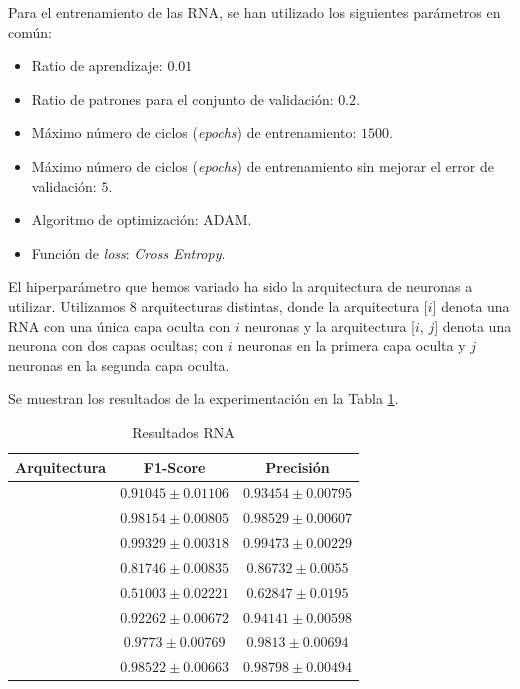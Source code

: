 \documentclass[12pt]{article}
\begin{document}
Para el entrenamiento de las RNA, se han utilizado los siguientes parámetros en común:
\begin{itemize}
	\item Ratio de aprendizaje: $0.01$
	\item Ratio de patrones para el conjunto de validación: $0.2$.
	\item Máximo número de ciclos (\textit{epochs}) de entrenamiento: $1500$.
	\item Máximo número de ciclos (\textit{epochs}) de entrenamiento sin mejorar el error de validación: $5$.
	\item Algoritmo de optimización: ADAM.
	\item Función de \textit{loss}: \textit{Cross Entropy}.
\end{itemize}
El hiperparámetro que hemos variado ha sido la arquitectura de neuronas a utilizar. Utilizamos 8 arquitecturas distintas,
donde la arquitectura [$i$] denota una RNA con una única capa oculta con $i$ neuronas y la arquitectura [$i$, $j$] 
denota una neurona con dos capas ocultas; con $i$ neuronas en la primera capa oculta y $j$ neuronas en la segunda capa oculta.

Se muestran los resultados de la experimentación en la Tabla \ref{Tab:ANN_3}.

\begin{table}[!ht]
	\caption{Resultados RNA}
	\centering
		 \begin{tabular}{||c c c||}
			 \hline
			 Arquitectura & F1-Score & Precisión  \\ [0.5ex]
			 \hline\hline
			 [8] & $0.91045 \pm 0.01106$ & $0.93454 \pm 0.00795$ \\
			\hline
			[16] & $0.98154 \pm 0.00805$ & $0.98529 \pm 0.00607$ \\
			\hline
			[32] & $0.99329 \pm 0.00318$ & $0.99473 \pm 0.00229$ \\
			\hline
			[8, 8] & $0.81746 \pm 0.00835$ & $0.86732 \pm 0.0055$ \\
			\hline
			[16, 4] & $0.51003 \pm 0.02221$ & $0.62847 \pm 0.0195$ \\
			\hline
			[16, 8] & $0.92262 \pm 0.00672$ & $0.94141 \pm 0.00598$ \\
			\hline
			[32, 16] & $0.9773 \pm 0.00769$ & $0.9813 \pm 0.00694$ \\
			\hline
			[32, 32] & $0.98522 \pm 0.00663$ & $0.98798 \pm 0.00494$ \\
			\hline
		 \end{tabular}
	\label{Tab:ANN_3}
	\end{table}
\end{document}
